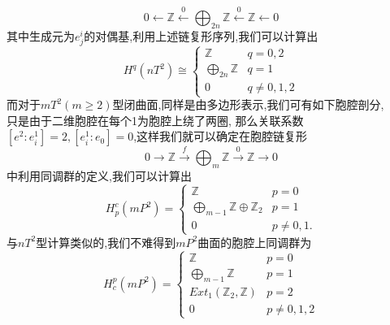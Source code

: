 \documentclass[b5paper]{ctexart}
\begin{document}
\[0\leftarrow \mathbb{Z}\xleftarrow{0} \bigoplus_{2n}\mathbb{Z}\xleftarrow{0}\mathbb{Z}\leftarrow 0\]
其中生成元为$e_j^i$的对偶基,利用上述链复形序列,我们可以计算出
\[H^q(nT^2)\cong\left\lbrace 
\begin{array}{ll}
\mathbb{Z}& q=0,2\\
\bigoplus\limits_{2n}\mathbb{Z}& q=1\\
0& q\neq 0,1,2
\end{array}\right. 
\]
而对于$mT^2(m\geq 2)$型闭曲面,同样是由多边形表示,我们可有如下胞腔剖分,\\只是由于二维胞腔在每个1为胞腔上绕了两圈,
那么关联系数$[e^2:e_i^1]=2,[e^1_i:e_0]=0$,这样我们就可以确定在胞腔链复形
\[0\rightarrow \mathbb{Z}\xrightarrow{f} \bigoplus_{m}\mathbb{Z}\xrightarrow{0}\mathbb{Z}\rightarrow 0\]
中利用同调群的定义,我们可以计算出
\[H_p^c(mP^2)=\left\lbrace \begin{array}{ll}
\mathbb{Z} & p=0\\
\bigoplus\limits_{m-1}\mathbb{Z}\oplus \mathbb{Z}_2 & p=1\\
0 & p\neq 0,1.
\end{array}\right. \]
与$nT^2$型计算类似的,我们不难得到$mP^2$曲面的胞腔上同调群为
\[H^p_c(mP^2)=\left\lbrace \begin{array}{ll}
\mathbb{Z} & p=0\\
\bigoplus\limits_{m-1}\mathbb{Z} & p=1\\
Ext_1(\mathbb{Z}_2,\mathbb{Z}) & p=2\\
0 & p\neq 0,1,2
\end{array}\right.\]
\end{document}
